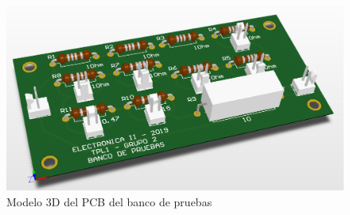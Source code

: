 \begin{figure}[!ht]
\begin{centering}
\includegraphics[scale=0.45]{Imagenes/Banco3D.png}
\par\end{centering}
\caption{Modelo 3D del PCB del banco de pruebas}

\end{figure}

